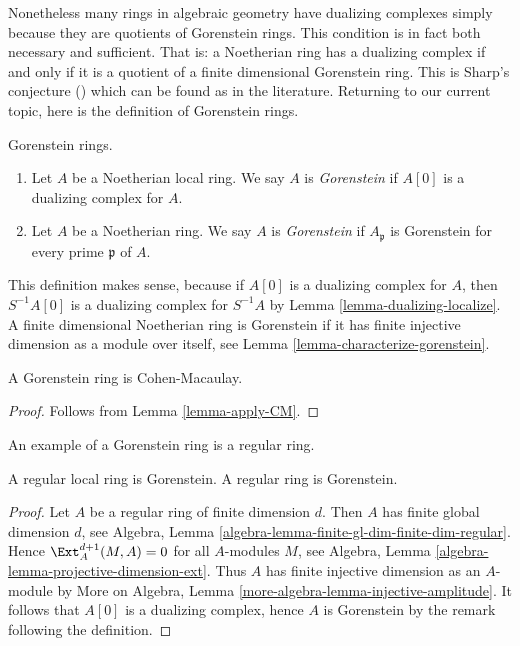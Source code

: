 \medskip\noindent
Nonetheless many rings in algebraic geometry have dualizing complexes
simply because they are quotients of Gorenstein rings. This condition
is in fact both necessary and sufficient. That is: a Noetherian ring
has a dualizing complex if and only if it is a quotient of a finite
dimensional Gorenstein ring. This is Sharp's conjecture (\cite{Sharp})
which can be found as \cite[Corollary 1.4]{Kawasaki} in the literature.
Returning to our current topic, here is the definition of Gorenstein rings.

\begin{definition}
\label{definition-gorenstein}
Gorenstein rings.
\begin{enumerate}
\item Let $A$ be a Noetherian local ring. We say $A$ is {\it Gorenstein}
if $A[0]$ is a dualizing complex for $A$.
\item Let $A$ be a Noetherian ring. We say $A$ is {\it Gorenstein}
if $A_\mathfrak p$ is Gorenstein for every prime $\mathfrak p$ of $A$.
\end{enumerate}
\end{definition}

\noindent
This definition makes sense, because if $A[0]$ is a dualizing complex
for $A$, then $S^{-1}A[0]$ is a dualizing complex for $S^{-1}A$ by
Lemma \ref{lemma-dualizing-localize}.
A finite dimensional Noetherian ring is Gorenstein
if it has finite injective dimension as a module over itself, see
Lemma \ref{lemma-characterize-gorenstein}.

\begin{lemma}
\label{lemma-gorenstein-CM}
A Gorenstein ring is Cohen-Macaulay.
\end{lemma}

\begin{proof}
Follows from Lemma \ref{lemma-apply-CM}.
\end{proof}

\noindent
An example of a Gorenstein ring is a regular ring.

\begin{lemma}
\label{lemma-regular-gorenstein}
A regular local ring is Gorenstein.
A regular ring is Gorenstein.
\end{lemma}

\begin{proof}
Let $A$ be a regular ring of finite dimension $d$. Then $A$ has finite
global dimension $d$, see
Algebra, Lemma \ref{algebra-lemma-finite-gl-dim-finite-dim-regular}.
Hence $\Ext^{d + 1}_A(M, A) = 0$ for all $A$-modules $M$, see
Algebra, Lemma \ref{algebra-lemma-projective-dimension-ext}.
Thus $A$ has finite injective dimension as an $A$-module by
More on Algebra, Lemma \ref{more-algebra-lemma-injective-amplitude}.
It follows that $A[0]$ is a dualizing complex, hence $A$ is
Gorenstein by the remark following the definition.
\end{proof}

